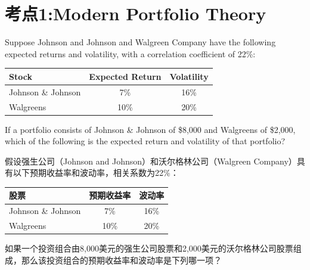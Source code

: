 \documentclass{article}
\newcounter{question} %
\begin{document}
 \tableofcontents %
\newpage


\iftrue
\section{考点1:Modern Portfolio Theory}
\setcounter{question}{0}


\begin{question}
    Suppose Johnson and Johnson and Walgreen Company have the following expected returns and volatility, with a correlation coefficient of 22\%:

    \begin{center}
        \begin{tabular}{|l|c|c|}
            \hline
            \textbf{Stock} & \textbf{Expected Return} & \textbf{Volatility} \\
            \hline
            Johnson \& Johnson & 7\% & 16\% \\
            \hline
            Walgreens & 10\% & 20\% \\
            \hline
        \end{tabular}
    \end{center}

    If a portfolio consists of Johnson \& Johnson of \$8,000 and Walgreens of \$2,000, which of the following is the expected return and volatility of that portfolio?
 
        假设强生公司（Johnson and Johnson）和沃尔格林公司（Walgreen Company）具有以下预期收益率和波动率，相关系数为22\%：
    
        \begin{center}
            \begin{tabular}{|l|c|c|}
                \hline
                \textbf{股票} & \textbf{预期收益率} & \textbf{波动率} \\
                \hline
                Johnson \& Johnson & 7\% & 16\% \\
                \hline
                Walgreens & 10\% & 20\% \\
                \hline
            \end{tabular}
        \end{center}
    
        如果一个投资组合由8,000美元的强生公司股票和2,000美元的沃尔格林公司股票组成，那么该投资组合的预期收益率和波动率是下列哪一项？
    
\end{question}
    
\end{document}
